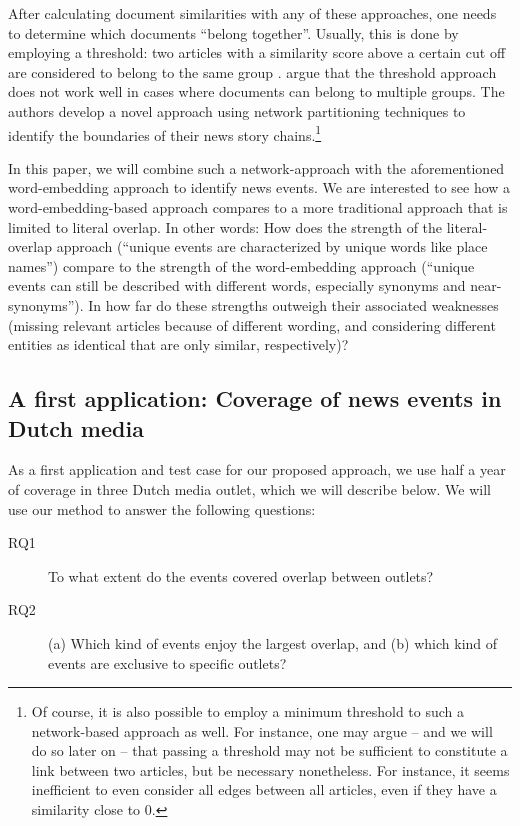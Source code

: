 \documentclass[a4paper,man,natbib,floatsintext,mask]{apa6}
\begin{document}
After calculating document similarities with any of these approaches, one needs to determine which documents ``belong together''. Usually, this is done by employing a threshold: two articles with a similarity score above a certain cut off are considered to belong to the same group \citep[e.g.][]{Boumans2018, Welbers2016}. \cite{Nicholls2018} argue that the threshold approach does not work well in cases where documents can belong to multiple groups. The authors develop a novel approach using network partitioning techniques to identify the boundaries of their news story chains.\footnote{Of course, it is also possible to employ a minimum threshold to such a network-based approach as well. For instance, one may argue -- and we will do so later on -- that passing a threshold may not be sufficient to constitute a link between two articles, but be necessary nonetheless. For instance, it seems inefficient to even consider all edges between all articles, even if they have a similarity close to 0.}

In this paper, we will combine such a network-approach with the aforementioned word-embedding approach to identify news events.
We are interested to see how a word-embedding-based approach compares to a more traditional approach that is limited to literal overlap.
In other words: How does the strength of the literal-overlap approach (``unique events are characterized by unique words like place names'') compare to the strength of the word-embedding approach (``unique events can still be described with different words, especially synonyms and near-synonyms''). In how far do these strengths outweigh their associated weaknesses (missing relevant articles because of different wording, and considering different entities as identical that are only similar, respectively)?

\subsection{A first application: Coverage of news events in Dutch media}
As a first application and test case for our proposed approach, we use half a year of coverage in three Dutch media outlet, which we will describe below.
We will use our method to answer the following questions:
\begin{description}
\item[RQ1] To what extent do the events covered overlap between outlets?
\item[RQ2] (a) Which kind of events enjoy the largest overlap, and (b) which kind of events are exclusive to specific outlets?
\end{description}
\end{document}
